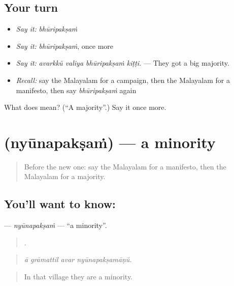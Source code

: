 \subsection*{Your turn}
\begin{itemize}
\raggedright
  \item \emph{Say it:} \emph{bhūripakṣaṁ}
  \item \emph{Say it:} \emph{bhūripakṣaṁ}, once more
  \item \emph{Say it:} \emph{avarkkŭ valiya bhūripakṣaṁ kiṭṭi.} — They got a big majority.
  \item \emph{Recall:} say the Malayalam for a campaign, then the Malayalam for a manifesto, then say \emph{bhūripakṣaṁ} again
\end{itemize}

\begin{tcolorbox}[breakable,colback=teal!4,colframe=teal!35!black,title={Before you move on}]
What does  mean? (\textquotedblleft{}A majority\textquotedblright{}.) Say it once more.
\end{tcolorbox}
\section[\texorpdfstring{\ml{ന്യൂനപക്ഷം} (nyūnapakṣaṁ)}{ന്യൂനപക്ഷം (nyūnapakṣaṁ)}]{ (nyūnapakṣaṁ) — a minority}

\label{lesson:ML-C420-nyunapaksam}



\begin{quote}
Before the new one: say the Malayalam for a manifesto, then the Malayalam for a majority.
\end{quote}

\subsection*{You'll want to know: }
\textbf{} — \emph{nyūnapakṣaṁ} — \textquotedblleft{}a minority\textquotedblright{}.

\begin{quote}
   .
\end{quote}

\begin{quote}
\emph{ā grāmattil avar nyūnapakṣamāṇŭ.}
\end{quote}

\begin{quote}
In that village they are a minority.
\end{quote}

